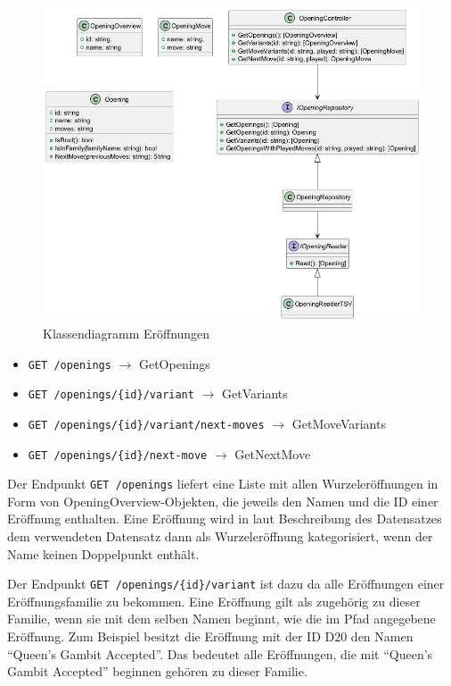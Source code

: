 \begin{figure}[htb]
  \includegraphics[width=\linewidth]{images/diagrams/opening.png}
  \caption{Klassendiagramm Eröffnungen}
  \label{fig:cd_opening}
\end{figure}

\begin{itemize}
  \item \lstinline|GET /openings| $\rightarrow$ GetOpenings
  \item \lstinline|GET /openings/{id}/variant| $\rightarrow$ GetVariants
  \item \lstinline|GET /openings/{id}/variant/next-moves| $\rightarrow$ GetMoveVariants
  \item \lstinline|GET /openings/{id}/next-move| $\rightarrow$ GetNextMove
\end{itemize}

Der Endpunkt \lstinline{GET /openings} liefert eine Liste mit allen Wurzeleröffnungen in Form von OpeningOverview-Objekten, die jeweils den Namen und die ID einer Eröffnung enthalten.
Eine Eröffnung wird in laut Beschreibung des Datensatzes dem verwendeten Datensatz \cite{lichessorg_chess-openings_2025} dann als Wurzeleröffnung kategorisiert, wenn der Name keinen Doppelpunkt enthält.

Der Endpunkt \lstinline|GET /openings/{id}/variant| ist dazu da alle Eröffnungen einer Eröffnungsfamilie zu bekommen. Eine Eröffnung gilt als zugehörig zu dieser Familie, wenn sie mit dem selben Namen beginnt, wie die im Pfad angegebene Eröffnung. Zum Beispiel besitzt die Eröffnung mit der ID D20 den Namen \enquote{Queen's Gambit Accepted}. Das bedeutet alle Eröffnungen, die mit \enquote{Queen's Gambit Accepted} beginnen gehören zu dieser Familie.

